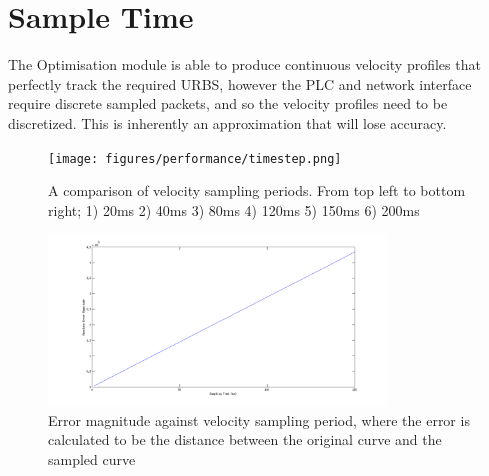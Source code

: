 \section{Sample Time}
\label{ch:performance-sampletime}

The Optimisation module is able to produce continuous velocity profiles that perfectly track the required URBS, however the PLC and network interface require discrete sampled packets, and so the velocity profiles need to be discretized. This is inherently an approximation that will lose accuracy.
\begin{figure}[hp]
\texttt{[image: figures/performance/timestep.png]}
\caption[Comparison of differing velocity sampling frequencies]{A comparison of velocity sampling periods. From top left to bottom right; 1) 20ms 2) 40ms 3) 80ms 4) 120ms 5) 150ms 6) 200ms
\label{fig:timestep}}
\end{figure} 

\begin{figure}
\centering
\includegraphics[width=0.8\textwidth]{figures/performance/tStep.png}
\caption[Plot of error magnitude against velocity sampling period]{Error magnitude against velocity sampling period, where the error is calculated to be the distance between the original curve and the sampled curve}
\label{fig:tStep}
\end{figure}  

